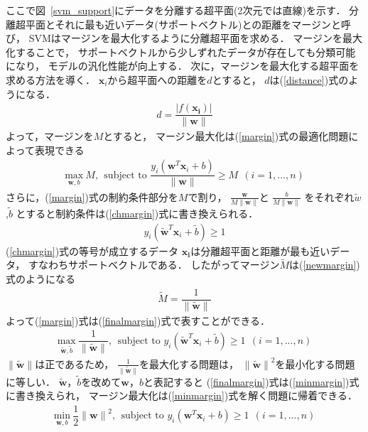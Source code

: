 ここで図~\ref{svm_support}にデータを分離する超平面(2次元では直線)を示す．
分離超平面とそれに最も近いデータ(サポートベクトル)との距離をマージンと呼び，
SVMはマージンを最大化するように分離超平面を求める．
マージンを最大化することで，
サポートベクトルから少しずれたデータが存在しても分類可能になり，
モデルの汎化性能が向上する．
次に，マージンを最大化する超平面を求める方法を導く．
$\boldsymbol{x}_i$から超平面への距離を$d$とすると，
$d$は(\ref{distance})式のようになる．
\begin{align}
    \label{distance}
d = \dfrac{|f(\boldsymbol{x_i})|}{\|\boldsymbol{w}\| }
\end{align}
よって，マージンを$M$とすると，
マージン最大化は(\ref{margin})式の最適化問題によって表現できる
\begin{align}
    \label{margin}
    \underset{{\boldsymbol{w},b}}{\text{max}}~M,~~ \text{subject to } \dfrac{y_i(\boldsymbol{w}^T \boldsymbol{x}_i + b)}{\|\boldsymbol{w}\|}
    \geq M ~~  (i=1,...,n)
\end{align}
さらに，(\ref{margin})式の制約条件部分を$M$で割り，
$\frac{\boldsymbol{w}}{M\|\boldsymbol{w}\|}$と
$\frac{b}{M\|\boldsymbol{w}\|}$
をそれぞれ$\tilde{w}$,$\tilde{b}$
とすると制約条件は(\ref{chmargin})式に書き換えられる．
\begin{align}
    \label{chmargin}
    y_i(\boldsymbol{\tilde{w}}^T \boldsymbol{x}_i + \tilde{b}) \geq 1
\end{align}
(\ref{chmargin})式の等号が成立するデータ
$\boldsymbol{x_i}$は分離超平面と距離が最も近いデータ，
すなわちサポートベクトルである．
したがってマージン$\tilde{M}$は(\ref{newmargin})式のようになる
\begin{align}
    \label{newmargin}
   \tilde{M} = \dfrac{1}{\|\boldsymbol{\tilde{w}}\|}
\end{align}
よって(\ref{margin})式は(\ref{finalmargin})式で表すことができる．
\begin{align}
    \label{finalmargin}
    \underset{\boldsymbol{\tilde{w}},\tilde{b}}{\text{max}}~\dfrac{1}{\|\boldsymbol{\tilde{w}}\|},
  ~~ \text{subject to } y_i(\boldsymbol{\tilde{w}}^T \boldsymbol{x}_i + \tilde{b}) \geq 1~~  (i=1,...,n)
\end{align}
$\|\boldsymbol{\tilde{w}}\|$は正であるため，
$\frac{1}{\|\boldsymbol{\tilde{w}}\|}$を最大化する問題は，
${\|\boldsymbol{\tilde{w}}\|}^2$を最小化する問題に等しい．
$\boldsymbol{\tilde{w}}$，$\tilde{b}$を改めて$\boldsymbol{w}$，$b$と表記すると
(\ref{finalmargin})式は(\ref{minmargin})式に書き換えられ，
マージン最大化は(\ref{minmargin})式を解く問題に帰着できる．
\begin{align}
    \label{minmargin}
    \underset{\boldsymbol{w},b}{\text{min}}~\dfrac{1}{2}{\|\boldsymbol{{w}}\|}^2,
  ~~ \text{subject to } y_i(\boldsymbol{w}^T \boldsymbol{x}_i + b) \geq 1~~  (i=1,...,n)
\end{align}
